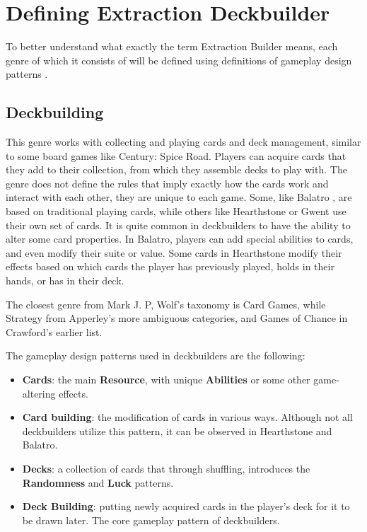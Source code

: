 \section{Defining Extraction Deckbuilder}

To better understand what exactly the term Extraction Builder means, each genre of which it consists of will be defined using definitions of gameplay design patterns \cite{gameplayDesignPatterns}.



\subsection{Deckbuilding}

This genre works with collecting and playing cards and deck management, similar to some board games like Century: Spice Road. Players can acquire cards that they add to their collection, from which they assemble decks to play with. The genre does not define the rules that imply exactly how the cards work and interact with each other, they are unique to each game. Some, like Balatro \cite{balatro2024}, are based on traditional playing cards, while others like Hearthstone \cite{hearthstone2014} or Gwent \cite{gwent2018} use their own set of cards. It is quite common in deckbuilders to have the ability to alter some card properties. In Balatro, players can add special abilities to cards, and even modify their suite or value. Some cards in Hearthstone modify their effects based on which cards the player has previously played, holds in their hands, or has in their deck. 

The closest genre from Mark J. P, Wolf's taxonomy\cite{wolf2002genre} is Card Games, while Strategy from Apperley's\cite{apperley2006genre} more ambiguous categories, and Games of Chance in Crawford's earlier list\cite{crawford1984art}.

The gameplay design patterns used in deckbuilders are the following:

\begin{itemize}
    \item \textbf{Cards}: the main \textbf{Resource}, with unique \textbf{Abilities} or some other game-altering effects.
    \item \textbf{Card building}: the modification of cards in various ways. Although not all deckbuilders utilize this pattern, it can be observed in Hearthstone\cite{hearthstone2014} and Balatro\cite{balatro2024}.
    \item \textbf{Decks}: a collection of cards that through shuffling, introduces the \textbf{Randomness} and \textbf{Luck} patterns.
    \item \textbf{Deck Building}: putting newly acquired cards in the player's deck for it to be drawn later. The core gameplay pattern of deckbuilders.
\end{itemize}



